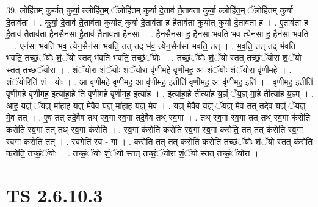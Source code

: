 \documentclass[17pt]{extarticle}
\begin{document}
39. लोहि॑तम् कुर्यात् कुर्या॒ ल्लोहि॑त॒म् ॅलोहि॑तम् कुर्या दे॒ताव॑ तै॒ताव॑ता कुर्या॒ ल्लोहि॑त॒म् ॅलोहि॑तम् कुर्या दे॒ताव॑ता । . कु॒र्या॒ दे॒ताव॑ तै॒ताव॑ता कुर्यात् कुर्या दे॒ताव॑ता ह है॒ताव॑ता कुर्यात् कुर्या दे॒ताव॑ता ह । . ए॒ताव॑ता ह है॒ताव॑ तै॒ताव॑ता॒ हैन॒सैन॑सा है॒ताव॑ तै॒ताव॑ता॒ हैन॑सा । . हैन॒सैन॑सा ह॒ हैन॑सा भवति भव॒ त्येन॑सा ह॒ हैन॑सा भवति । . एन॑सा भवति भव॒ त्येन॒सैन॑सा भवति॒ तत् तद् भ॑व॒ त्येन॒सैन॑सा भवति॒ तत् । . भ॒व॒ति॒ तत् तद् भ॑वति भवति॒ तच्छं॒ॅयोः शं॒ॅयो स्तद् भ॑वति भवति॒ तच्छं॒ॅयोः । . तच्छं॒ॅयोः शं॒ॅयो स्तत् तच्छं॒ॅयोरा शं॒ॅयो स्तत् तच्छं॒ॅयोरा । . शं॒ॅयोरा शं॒ॅयोः शं॒ॅयोरा वृ॑णीमहे वृणीमह॒ आ शं॒ॅयोः शं॒ॅयोरा वृ॑णीमहे । . शं॒ॅयोरिति॑ शं - योः । . आ वृ॑णीमहे वृणीमह॒ आ वृ॑णीमह॒ इतीति॑ वृणीमह॒ आ वृ॑णीमह॒ इति॑ । . वृ॒णी॒म॒ह॒ इतीति॑ वृणीमहे वृणीमह॒ इत्या॑हा॒हे ति॑ वृणीमहे वृणीमह॒ इत्या॑ह । . इत्या॑हा॒हे तीत्या॑ह य॒ज्ञ्ं ॅय॒ज्ञ् मा॒हे तीत्या॑ह य॒ज्ञ्म् । . आ॒ह॒ य॒ज्ञ्ं ॅय॒ज्ञ् मा॑हाह य॒ज्ञ् मे॒वैव य॒ज्ञ् मा॑हाह य॒ज्ञ् मे॒व । . य॒ज्ञ् मे॒वैव य॒ज्ञ्ं ॅय॒ज्ञ् मे॒व तत् तदे॒व य॒ज्ञ्ं ॅय॒ज्ञ् मे॒व तत् । . ए॒व तत् तदे॒वैव तथ् स्व॒गा स्व॒गा तदे॒वैव तथ् स्व॒गा । . तथ् स्व॒गा स्व॒गा तत् तथ् स्व॒गा क॑रोति करोति स्व॒गा तत् तथ् स्व॒गा क॑रोति । . स्व॒गा क॑रोति करोति स्व॒गा स्व॒गा क॑रोति॒ तत् तत् क॑रोति स्व॒गा स्व॒गा क॑रोति॒ तत् । . स्व॒गेति॑ स्व - गा । . क॒रो॒ति॒ तत् तत् क॑रोति करोति॒ तच्छं॒ॅयोः शं॒ॅयो स्तत् क॑रोति करोति॒ तच्छं॒ॅयोः । . तच्छं॒ॅयोः शं॒ॅयो स्तत् तच्छं॒ॅयोरा शं॒ॅयो स्तत् तच्छं॒ॅयोरा । \newline
\pagebreak
{}
\section*{ TS 2.6.10.3 }
\end{document}
